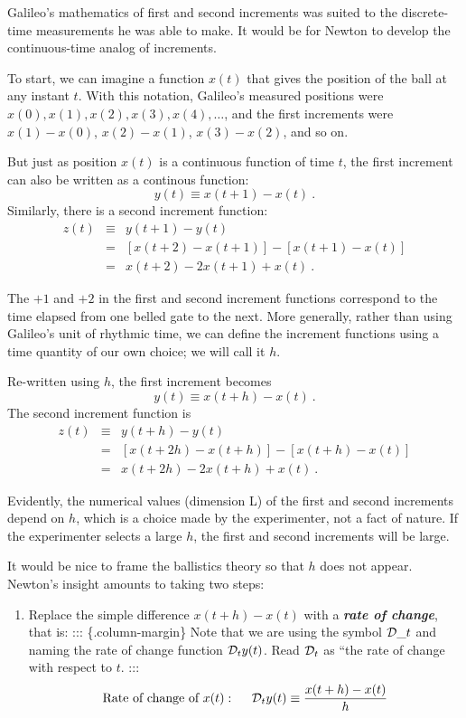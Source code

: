 \documentclass[
  letterpaper,
  DIV=11,
  numbers=noendperiod,
  oneside]{scrreprt}
\providecommand{\tightlist}{%
  \setlength{\itemsep}{0pt}\setlength{\parskip}{0pt}}
\begin{document}
Galileo's mathematics of first and second increments was suited to the
discrete-time measurements he was able to make. It would be for Newton
to develop the continuous-time analog of increments.

To start, we can imagine a function \(x(t)\) that gives the position of
the ball at any instant \(t\). With this notation, Galileo's measured
positions were \(x(0), x(1), x(2), x(3), x(4), \ldots\), and the first
increments were \(x(1) - x(0)\), \(x(2) - x(1)\), \(x(3) - x(2)\), and
so on.

But just as position \(x(t)\) is a continuous function of time \(t\),
the first increment can also be written as a continous function:
\[y(t) \equiv x(t+1) - x(t)\ .\] Similarly, there is a second increment
function:
\begin{eqnarray}z(t) & \equiv&  y(t+1) - y(t)\\ & = & \left[x(t+2) - x(t+1)\right] - \left[x(t+1) - x(t)\right] \\ &=& x(t+2) - 2 x(t+1) + x(t)\ .
\end{eqnarray}

The \(+1\) and \(+2\) in the first and second increment functions
correspond to the time elapsed from one belled gate to the next. More
generally, rather than using Galileo's unit of rhythmic time, we can
define the increment functions using a time quantity of our own choice;
we will call it \(h\).

Re-written using \(h\), the first increment becomes
\[y(t) \equiv x(t+h) - x(t)\ .\] The second increment function is
\begin{eqnarray}z(t) & \equiv&  y(t+h) - y(t)\\ & = & \left[x(t+2h) - x(t+h)\right] - \left[x(t+h) - x(t)\right] \\ &=& x(t+2h) - 2 x(t+h) + x(t)\ .
\end{eqnarray}

Evidently, the numerical values (dimension L) of the first and second
increments depend on \(h\), which is a choice made by the experimenter,
not a fact of nature. If the experimenter selects a large \(h\), the
first and second increments will be large.

It would be nice to frame the ballistics theory so that \(h\) does not
appear. Newton's insight amounts to taking two steps:

\begin{enumerate}
\def\labelenumi{\arabic{enumi}.}
\tightlist
\item
  Replace the simple difference \(x(t+h) - x(t)\) with a
  \textbf{\emph{rate of change}}, that is: ::: \{.column-margin\} Note
  that we are using the symbol \({\cal D}\_t\) and naming the rate of
  change function \({\cal D}_t y(t)\). Read \({\cal D}_t\) as ``the rate
  of change with respect to \(t\). :::
  \[\text{Rate of change of } x(t): \ \ \ \ {\cal D}_t y(t) \equiv \frac{x(t+h) - x(t)}{h}\]
\end{enumerate}
\end{document}
